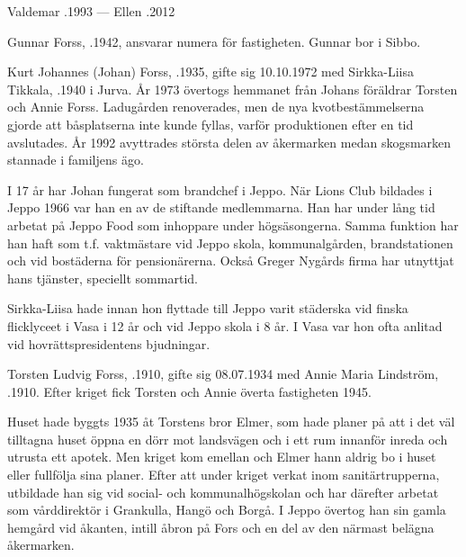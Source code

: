 Valdemar .1993  ---  Ellen .2012



%


%
Gunnar Forss, .1942, ansvarar numera för fastigheten. Gunnar bor i Sibbo.\jhvspace{}



%
Kurt Johannes (Johan) Forss, .1935, gifte sig 10.10.1972 med Sirkka-Liisa Tikkala, .1940 i Jurva. År 1973 övertogs hemmanet från Johans föräldrar Torsten och Annie Forss. Ladugården renoverades, men de nya kvotbestämmelserna gjorde att båsplatserna inte kunde fyllas, varför produktionen efter en tid avslutades. År 1992 avyttrades största delen av åkermarken medan skogsmarken stannade i familjens ägo.

I 17 år har Johan fungerat som brandchef i Jeppo. När Lions Club bildades i Jeppo 1966 var han en av de stiftande medlemmarna. Han har under lång tid arbetat på Jeppo Food som inhoppare under högsäsongerna. Samma funktion har han haft som t.f. vaktmästare vid Jeppo skola, kommunalgården, brandstationen och vid bostäderna för pensionärerna. Också Greger Nygårds firma har utnyttjat hans tjänster, speciellt sommartid.

Sirkka-Liisa hade innan hon flyttade till Jeppo varit städerska vid finska flicklyceet i Vasa i 12 år och vid Jeppo skola i 8 år. I Vasa var hon ofta anlitad vid hovrättspresidentens bjudningar.
\begin{jhchildren}
  \item {}
  \item {}
\end{jhchildren}


%
Torsten Ludvig Forss, .1910, gifte sig 08.07.1934 med Annie Maria Lindström, .1910. Efter kriget fick Torsten och Annie överta fastigheten 1945.

Huset hade byggts 1935 åt Torstens bror Elmer, som hade planer på att i det väl tilltagna huset öppna en dörr mot landsvägen och i ett rum innanför inreda och utrusta ett apotek. Men kriget kom emellan och Elmer hann aldrig bo i huset eller fullfölja sina planer. Efter att under kriget verkat inom sanitärtrupperna, utbildade han sig vid social- och kommunalhögskolan och har därefter arbetat som vårddirektör i Grankulla, Hangö och Borgå. I Jeppo övertog han sin gamla hemgård vid åkanten, intill åbron på Fors och en del av den närmast belägna åkermarken.

